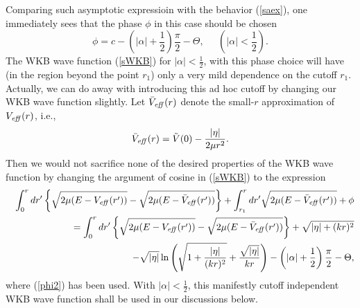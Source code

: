 \documentclass[a4paper,aps,eqsecnum,preprint,preprintnumbers,12pt]{revtex4}
\begin{document}
Comparing such asymptotic expressioin with the behavior
(\ref{saex}), one immediately sees that the phase $\phi$ in this
case should be chosen
\begin{equation} \label{phi2}
\phi = c - \left( |\alpha| + \frac{1}{2} \right) \frac{\pi}{2} -
\Theta, \;\;\;\;\; \left( |\alpha| < \frac{1}{2} \right).
\end{equation}
The WKB wave function (\ref{sWKB}) for $|\alpha| < \displaystyle
\frac{1}{2}$, with this phase choice will have (in the region
beyond the point $r_{1}$) only a very mild dependence on the
cutoff $r_{1}$. Actually, we can do away with introducing this ad
hoc cutoff by changing our WKB wave function slightly. Let
$\bar{V}_{\it eff}(r)$ denote the small-$r$ approximation of
$V_{\it eff}(r)$, i.e.,
\begin{equation}
\bar{V}_{\it eff}(r) = \tilde{V}(0) - \frac{|\eta|}{2\mu r^{2}}.
\end{equation}
Then we would not sacrifice none of the desired properties of the
WKB wave function by changing the argument of cosine in
(\ref{sWKB}) to the expression
\begin{eqnarray}
&& \int_{0}^{r} dr' \left\{ \sqrt{ 2\mu ( E - V_{\it eff}(r') ) }
- \sqrt{ 2\mu ( E - \bar{V}_{\it eff}(r') ) } \right\} +
\int_{r_{1}}^{r} dr' \sqrt{ 2\mu ( E - \bar{V}_{\it eff}(r') ) } +
\phi \nonumber \\
&& \; = \int_{0}^{r} dr' \left\{ \sqrt{ 2\mu ( E - V_{\it eff}(r')
) } - \sqrt{ 2\mu ( E - \bar{V}_{\it eff}(r') ) } \right\} +
\sqrt{ |\eta| + (kr)^{2} } \nonumber \\
&& \;\;\;\;\; - \sqrt{|\eta|} \ln \left( \sqrt{ 1 +
\frac{|\eta|}{(kr)^{2}} } + \frac{\sqrt{|\eta|}}{kr} \right) -
\left( |\alpha| + \frac{1}{2} \right) \frac{\pi}{2} - \Theta,
\end{eqnarray}
where (\ref{phi2}) has been used. With $|\alpha| < \displaystyle
\frac{1}{2}$, this manifestly cutoff independent WKB wave function
shall be used in our discussions below.
\end{document}
